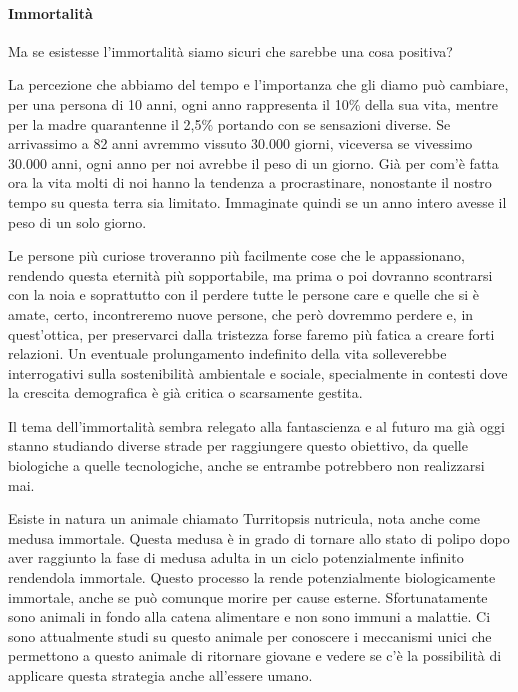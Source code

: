 \documentclass[12pt]{book} %
\begin{document}
\paragraph{Immortalità}

Ma se esistesse l'immortalità siamo sicuri che sarebbe una cosa positiva?

La percezione che abbiamo del tempo e l'importanza che gli diamo può cambiare, per una persona
di 10 anni, ogni anno rappresenta il 10\% della sua vita, mentre per la madre quarantenne il 2,5\% portando con se
sensazioni diverse. Se arrivassimo a 82 anni avremmo vissuto 30.000 giorni, viceversa se vivessimo 30.000 anni, ogni
anno per noi avrebbe il peso di un giorno. Già per com'è fatta ora la vita molti di noi hanno la
tendenza a procrastinare, nonostante il nostro tempo su questa terra sia limitato. Immaginate quindi se un anno intero
avesse il peso di un solo giorno.

Le persone più curiose troveranno più facilmente cose che le appassionano, rendendo questa eternità più sopportabile, ma
prima o poi dovranno scontrarsi con la noia e soprattutto con il perdere tutte le persone care e quelle che si è amate,
certo, incontreremo nuove persone, che però dovremmo perdere e, in quest'ottica, per preservarci dalla tristezza forse faremo più fatica a creare forti relazioni. Un eventuale prolungamento indefinito della vita solleverebbe interrogativi sulla sostenibilità ambientale e sociale, specialmente in contesti dove la crescita demografica è già critica o scarsamente gestita.

Il tema dell'immortalità sembra relegato alla fantascienza e al futuro ma già oggi stanno studiando
diverse strade per raggiungere questo obiettivo, da quelle biologiche a quelle tecnologiche, anche se entrambe potrebbero non realizzarsi mai. 

Esiste in natura un animale chiamato Turritopsis nutricula, nota anche come medusa immortale. Questa medusa è in grado
di tornare allo stato di polipo dopo aver raggiunto la fase di medusa adulta in un ciclo potenzialmente infinito rendendola immortale.
Questo processo la rende potenzialmente biologicamente immortale, anche se può comunque morire per cause esterne.
Sfortunatamente sono animali in fondo alla catena alimentare e non sono immuni a malattie. Ci sono attualmente studi su
questo animale per conoscere i meccanismi unici che permettono a questo animale di ritornare giovane e vedere se
c'è la possibilità di applicare questa strategia anche all'essere umano.
\end{document}
